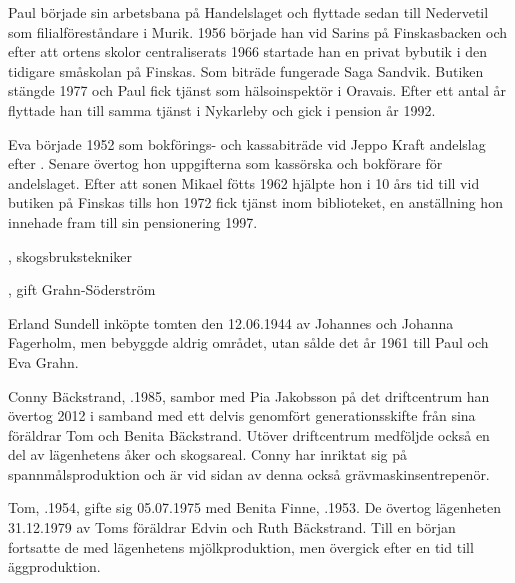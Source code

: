 Paul började sin arbetsbana på Handelslaget och flyttade sedan till Nedervetil som filialföreståndare i Murik. 1956 började han vid Sarins på Finskasbacken och efter att ortens skolor centraliserats 1966 startade han en privat bybutik i den tidigare småskolan på Finskas. Som biträde fungerade Saga Sandvik. Butiken stängde 1977 och Paul fick tjänst som hälsoinspektör i Oravais. Efter ett antal år flyttade han till samma tjänst i Nykarleby och gick i pension år 1992.

Eva började 1952 som bokförings- och kassabiträde vid Jeppo Kraft andelslag efter . Senare övertog hon uppgifterna som kassörska och bokförare för andelslaget. Efter att sonen Mikael fötts 1962 hjälpte hon i 10 års tid till vid butiken på Finskas tills hon 1972 fick tjänst inom biblioteket, en anställning hon innehade fram till sin pensionering 1997.
\begin{jhchildren}
  \item {}
  \item {}, skogsbrukstekniker
  \item {}, gift Grahn-Söderström
\end{jhchildren}


Erland Sundell inköpte tomten den 12.06.1944 av Johannes och Johanna Fagerholm, men bebyggde aldrig området, utan sålde det år 1961 till Paul och Eva Grahn.





Conny Bäckstrand, .1985, sambor med Pia Jakobsson på det driftcentrum han övertog 2012 i samband med ett delvis genomfört generationsskifte från sina föräldrar Tom och Benita Bäckstrand. Utöver driftcentrum medföljde också en del av lägenhetens åker och skogsareal. Conny har inriktat sig på spannmålsproduktion och är vid sidan av denna också grävmaskinsentrepenör.


Tom, .1954, gifte sig 05.07.1975 med Benita Finne, .1953. De övertog lägenheten 31.12.1979 av Toms föräldrar Edvin och Ruth Bäckstrand. Till en början fortsatte de med lägenhetens mjölkproduktion, men övergick efter en tid till äggproduktion.

